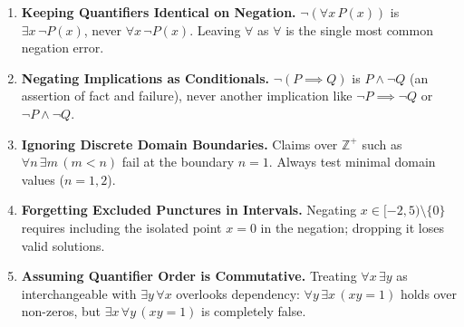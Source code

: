 \documentclass[11pt,a4paper]{article}
\begin{document}
\begin{enumerate}[leftmargin=2em, itemsep=4pt]
  \item \textbf{Keeping Quantifiers Identical on Negation.}
        $\neg(\forall x\,P(x))$ is $\exists x\,\neg P(x)$, never $\forall x\,\neg P(x)$. Leaving $\forall$ as $\forall$ is the single most common negation error. 
  \item \textbf{Negating Implications as Conditionals.}
        $\neg(P\implies Q)$ is $P\land\neg Q$ (an assertion of fact and failure), never another implication like $\neg P\implies\neg Q$ or $\neg P\land\neg Q$. 
  \item \textbf{Ignoring Discrete Domain Boundaries.}
        Claims over $\mathbb{Z}^+$ such as $\forall n\,\exists m\,(m < n)$ fail at the boundary $n=1$. Always test minimal domain values ($n=1, 2$). 
  \item \textbf{Forgetting Excluded Punctures in Intervals.}
        Negating $x \in [-2, 5)\setminus\{0\}$ requires including the isolated point $x=0$ in the negation; dropping it loses valid solutions. 
  \item \textbf{Assuming Quantifier Order is Commutative.}
        Treating $\forall x\,\exists y$ as interchangeable with $\exists y\,\forall x$ overlooks dependency: $\forall y\,\exists x\,(xy=1)$ holds over non-zeros, but $\exists x\,\forall y\,(xy=1)$ is completely false. 
\end{enumerate}

\end{document}
